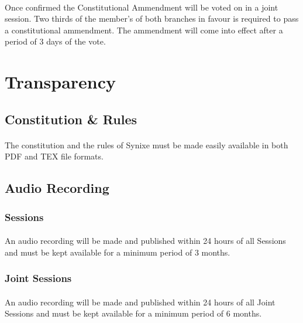 \documentclass[10pt,a4paper]{article}
\begin{document}
\paragraph{}
Once confirmed the Constitutional Ammendment will be voted on in a joint session. Two thirds of the member's of both branches in favour is required to pass a constitutional ammendment. The ammendment will come into effect after a period of 3 days of the vote.
\section{Transparency}
\subsection{Constitution \& Rules}
\paragraph{}
The constitution and the rules of Synixe must be made easily available in both PDF and TEX file formats.
\subsection{Audio Recording}
\subsubsection{Sessions}
\paragraph{}
An audio recording will be made and published within 24 hours of all Sessions and must be kept available for a minimum period of 3 months.
\subsubsection{Joint Sessions}
\paragraph{}
An audio recording will be made and published within 24 hours of all Joint Sessions and must be kept available for a minimum period of 6 months.
\end{document}
